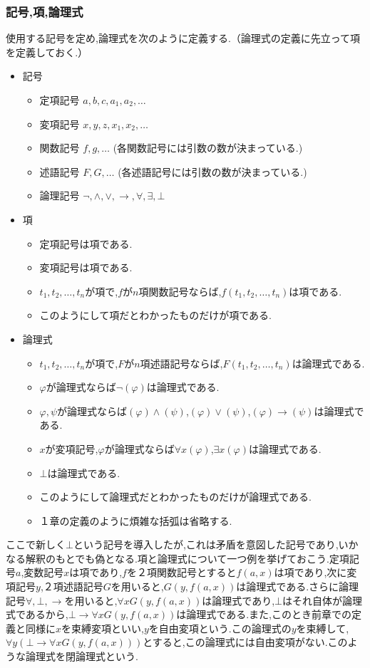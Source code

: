 \documentclass[10pt,b5paper,papersize,dvipdfmx]{jsbook}
\begin{document}
\subsubsection{記号,項,論理式}
使用する記号を定め,論理式を次のように定義する.（論理式の定義に先立って項を定義しておく.）
\begin{itemize}
\item 記号
\begin{itemize}
\item 定項記号 $a,b,c,a_1,a_2,\dots$
\item 変項記号 $x,y,z,x_1,x_2,\dots$
\item 関数記号 $f,g,\dots$ (各関数記号には引数の数が決まっている.)
\item 述語記号 $F,G,\dots$ (各述語記号には引数の数が決まっている.)
\item 論理記号 $\lnot,\land,\lor,\to,\forall,\exists,\bot$
\end{itemize}
\item 項
\begin{itemize}
\item 定項記号は項である.
\item 変項記号は項である.
\item $t_1,t_2,\dots,t_n$が項で,$f$が$n$項関数記号ならば,$f(t_1,t_2,\dots,t_n)$は項である.
\item このようにして項だとわかったものだけが項である.
\end{itemize}
\item 論理式
\begin{itemize}
\item $t_1,t_2,\dots,t_n$が項で,$F$が$n$項述語記号ならば,$F(t_1,t_2,\dots,t_n)$は論理式である.
\item $\varphi$が論理式ならば$\lnot (\varphi)$は論理式である.
\item $\varphi,\psi$が論理式ならば$(\varphi) \land (\psi)$,$(\varphi) \lor (\psi)$,$(\varphi) \to (\psi)$は論理式である.
\item $x$が変項記号,$\varphi$が論理式ならば$\forall x (\varphi)$,$\exists x (\varphi)$は論理式である.
\item $\bot$は論理式である.
\item このようにして論理式だとわかったものだけが論理式である.
\item １章の定義のように煩雑な括弧は省略する.
\end{itemize}
\end{itemize}
ここで新しく$\bot$という記号を導入したが,これは矛盾を意図した記号であり,いかなる解釈のもとでも偽となる.項と論理式について一つ例を挙げておこう.定項記号$a$,変数記号$x$は項であり,$f$を２項関数記号とすると$f(a,x)$は項であり,次に変項記号$y$,２項述語記号$G$を用いると,$G(y,f(a,x))$は論理式である.さらに論理記号$\forall,\bot,\to$を用いると,$\forall xG(y,f(a,x))$は論理式であり,$\bot$はそれ自体が論理式であるから,$\bot \to \forall xG(y,f(a,x))$は論理式である.また,このとき前章での定義と同様に$x$を束縛変項といい,$y$を自由変項という.この論理式の$y$を束縛して,$\forall y(\bot \to \forall xG(y,f(a,x)))$とすると,この論理式には自由変項がない.このような論理式を閉論理式という.
\end{document}
